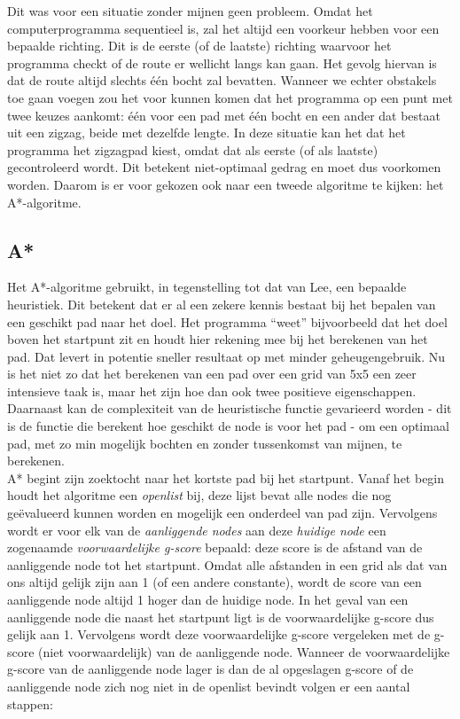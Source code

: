 \documentclass{report}
\begin{document}
Dit was voor een situatie zonder mijnen geen probleem.
Omdat het computerprogramma sequentieel is, zal het altijd een voorkeur hebben voor een bepaalde richting.
Dit is de eerste (of de laatste) richting waarvoor het programma checkt of de route er wellicht langs kan gaan.
Het gevolg hiervan is dat de route altijd slechts één bocht zal bevatten.
Wanneer we echter obstakels toe gaan voegen zou het voor kunnen komen dat het programma op een punt met twee keuzes aankomt: één voor een pad met één bocht en een ander dat bestaat uit een zigzag, beide met dezelfde lengte.
In deze situatie kan het dat het programma het zigzagpad kiest, omdat dat als eerste (of als laatste) gecontroleerd wordt.
Dit betekent niet-optimaal gedrag en moet dus voorkomen worden.
Daarom is er voor gekozen ook naar een tweede algoritme te kijken: het A*-algoritme.

\subsection{A*}
\label{ssec:astar}

Het A*-algoritme gebruikt, in tegenstelling tot dat van Lee, een bepaalde heuristiek.
Dit betekent dat er al een zekere kennis bestaat bij het bepalen
van een geschikt pad naar het doel.
Het programma ``weet'' bijvoorbeeld dat het doel boven het startpunt zit en houdt hier rekening mee bij het berekenen van het pad.
Dat levert in potentie sneller resultaat op met minder geheugengebruik.
Nu is het niet zo dat het berekenen van een pad over een grid van 5x5 een zeer intensieve taak is, maar het zijn hoe dan ook twee positieve eigenschappen.
Daarnaast kan de complexiteit van de heuristische functie gevarieerd worden - dit is de functie die berekent hoe geschikt de node is voor het pad - om een optimaal pad, met zo min mogelijk bochten en zonder tussenkomst van mijnen, te berekenen.\\

A* begint zijn zoektocht naar het kortste pad bij het startpunt.
Vanaf het begin houdt het algoritme een \textit{openlist} bij, deze lijst bevat alle nodes die nog geëvalueerd kunnen worden en mogelijk een onderdeel van pad zijn.
Vervolgens wordt er voor elk van de \textit{aanliggende nodes} aan deze \textit{huidige node} een zogenaamde \textit{voorwaardelijke g-score} bepaald: deze score is de afstand van de aanliggende node tot het startpunt.
Omdat alle afstanden in een grid als dat van ons altijd gelijk zijn aan 1 (of een andere constante), wordt de score van een aanliggende node altijd 1 hoger dan de huidige node.
In het geval van een aanliggende node die naast het startpunt ligt is de voorwaardelijke g-score dus gelijk aan 1.
Vervolgens wordt deze voorwaardelijke g-score vergeleken met de g-score (niet voorwaardelijk) van de aanliggende node.
Wanneer de voorwaardelijke g-score van de aanliggende node lager is dan de al opgeslagen g-score of de aanliggende node zich nog niet in de openlist bevindt volgen er een aantal stappen:
\end{document}
